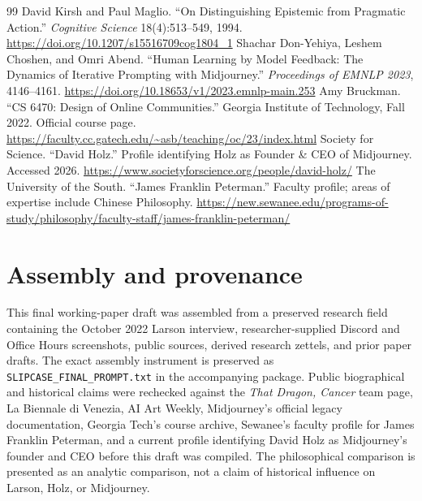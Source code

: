 \documentclass[11pt]{article}
\begin{document}
\begin{thebibliography}{99}
 David Kirsh and Paul Maglio. ``On Distinguishing Epistemic from Pragmatic Action.'' \emph{Cognitive Science} 18(4):513--549, 1994. \url{https://doi.org/10.1207/s15516709cog1804_1}
 Shachar Don-Yehiya, Leshem Choshen, and Omri Abend. ``Human Learning by Model Feedback: The Dynamics of Iterative Prompting with Midjourney.'' \emph{Proceedings of EMNLP 2023}, 4146--4161. \url{https://doi.org/10.18653/v1/2023.emnlp-main.253}
 Amy Bruckman. ``CS 6470: Design of Online Communities.'' Georgia Institute of Technology, Fall 2022. Official course page. \url{https://faculty.cc.gatech.edu/~asb/teaching/oc/23/index.html}
 Society for Science. ``David Holz.'' Profile identifying Holz as Founder \& CEO of Midjourney. Accessed 2026. \url{https://www.societyforscience.org/people/david-holz/}
 The University of the South. ``James Franklin Peterman.'' Faculty profile; areas of expertise include Chinese Philosophy. \url{https://new.sewanee.edu/programs-of-study/philosophy/faculty-staff/james-franklin-peterman/}
\end{thebibliography}

\appendix
\section{Assembly and provenance}
This final working-paper draft was assembled from a preserved research field containing the October 2022 Larson interview, researcher-supplied Discord and Office Hours screenshots, public sources, derived research zettels, and prior paper drafts. The exact assembly instrument is preserved as \texttt{SLIPCASE\_FINAL\_PROMPT.txt} in the accompanying package. Public biographical and historical claims were rechecked against the \emph{That Dragon, Cancer} team page, La Biennale di Venezia, AI Art Weekly, Midjourney's official legacy documentation, Georgia Tech's course archive, Sewanee's faculty profile for James Franklin Peterman, and a current profile identifying David Holz as Midjourney's founder and CEO before this draft was compiled. The philosophical comparison is presented as an analytic comparison, not a claim of historical influence on Larson, Holz, or Midjourney.
\end{document}
